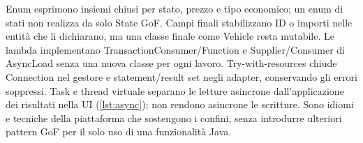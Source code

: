 Enum esprimono insiemi chiusi per stato, prezzo e tipo economico; un enum
di stati non realizza da solo State GoF. Campi finali stabilizzano ID o
importi nelle entità che li dichiarano, ma una classe finale come Vehicle
resta mutabile. Le lambda implementano TransactionConsumer/Function e
Supplier/Consumer di AsyncLoad senza una nuova classe per ogni lavoro.
Try-with-resources chiude Connection nel gestore e statement/result set
negli adapter, conservando gli errori soppressi. Task e thread virtuale
separano le letture asincrone dall'applicazione dei risultati nella UI
(\ref{lst:async}); non rendono asincrone le scritture. Sono idiomi e
tecniche della piattaforma che sostengono i confini, senza introdurre
ulteriori pattern GoF per il solo uso di una funzionalità Java.
\endgroup
\setcounter{secnumdepth}{2}
